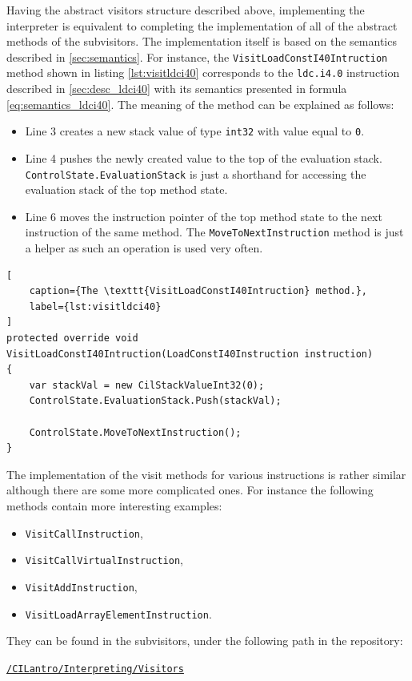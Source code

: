 \documentclass[declaration,shortabstract,english,mgr]{iithesis}
\begin{document}
Having the abstract visitors structure described above, implementing the interpreter is equivalent to completing the implementation of all of the abstract methods of the subvisitors. The implementation itself is based on the semantics described in \ref{sec:semantics}. For instance, the \texttt{VisitLoadConstI40Intruction} method shown in listing \ref{lst:visitldci40} corresponds to the \texttt{ldc.i4.0} instruction described in \ref{sec:desc_ldci40} with its semantics presented in formula \ref{eq:semantics_ldci40}. The meaning of the method can be explained as follows:
\begin{itemize}
	\item{Line 3 creates a new stack value of type \texttt{int32} with value equal to \texttt{0}.}
	\item{Line 4 pushes the newly created value to the top of the evaluation stack. \texttt{ControlState.EvaluationStack} is just a shorthand for accessing the evaluation stack of the top method state.}
	\item{Line 6 moves the instruction pointer of the top method state to the next instruction of the same method. The \texttt{MoveToNextInstruction} method is just a helper as such an operation is used very often.}
\end{itemize}

\begin{lstlisting}[
	caption={The \texttt{VisitLoadConstI40Intruction} method.},
	label={lst:visitldci40}
]
protected override void VisitLoadConstI40Intruction(LoadConstI40Instruction instruction)
{
	var stackVal = new CilStackValueInt32(0);
	ControlState.EvaluationStack.Push(stackVal);

	ControlState.MoveToNextInstruction();
}
\end{lstlisting}

The implementation of the visit methods for various instructions is rather similar although there are some more complicated ones. For instance the following methods contain more interesting examples:
\begin{itemize}
	\item{\texttt{VisitCallInstruction},}
	\item{\texttt{VisitCallVirtualInstruction},}
	\item{\texttt{VisitAddInstruction},}
	\item{\texttt{VisitLoadArrayElementInstruction}.}
\end{itemize}
They can be found in the subvisitors, under the following path in the repository:
\begin{center}
	\href{https://github.com/kvasnyk/CILantro/tree/master/CILantro/CILantro/Interpreting/Visitors}{\texttt{/CILantro/Interpreting/Visitors}}
\end{center}
\end{document}
